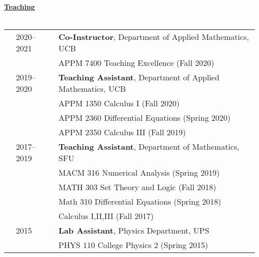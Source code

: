 \documentclass[letterpaper,11pt,oneside]{article}
\newcommand{\headr}[1]{\vspace{10pt}\uline{\Large{\textbf{#1}} \hfill } \\ \vspace{-10pt}\\}
\begin{document}
\headr{Teaching}
\begin{tabular}{p{0.01cm} p{4.5cm} p{12cm}}
& 2020--2021 & \textbf{Co-Instructor}, Department of Applied Mathematics, UCB \\
&     & APPM 7400 Teaching Excellence (Fall 2020)\\ \vspace{-0.75cm}
& 2019-- 2020 & \textbf{Teaching Assistant}, Department of Applied Mathematics, UCB \\
&     & APPM 1350 Calculus I (Fall 2020)\\
&     & APPM 2360 Differential Equations (Spring 2020)\\
&     & APPM 2350 Calculus III (Fall 2019)\\
& 2017--2019  & \textbf{Teaching Assistant}, Department of Mathematics, SFU  \\
&     & MACM 316 Numerical Analysis (Spring 2019) \\
&     & MATH 303 Set Theory and Logic (Fall 2018) \\ 
&     & Math 310 Differential Equations (Spring 2018) \\ 
&     & Calculus I,II,III (Fall 2017)\\
& 2015  &\textbf{Lab Assistant}, Physics Department, UPS \\
&     & PHYS 110 College Physics 2 (Spring 2015) \\
\end{tabular}
\end{document}
